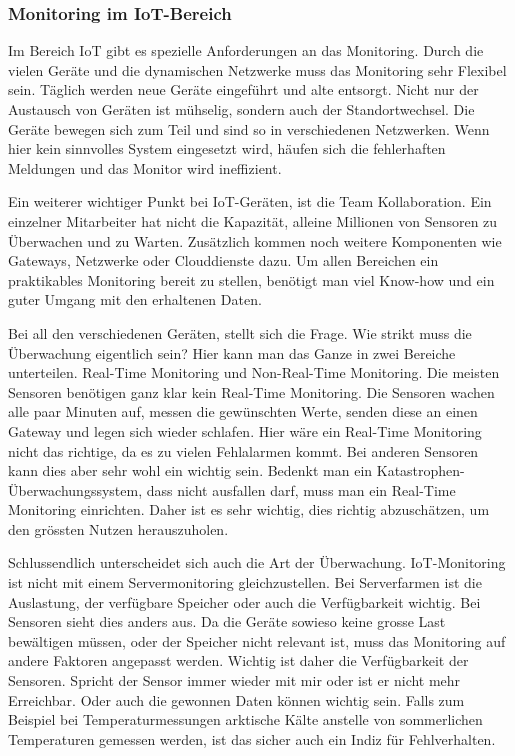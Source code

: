 \subsubsection{Monitoring im IoT-Bereich}
Im Bereich IoT gibt es spezielle Anforderungen an das Monitoring. Durch die vielen Geräte und die dynamischen Netzwerke muss das Monitoring sehr Flexibel sein. Täglich werden neue Geräte eingeführt und alte entsorgt. Nicht nur der Austausch von Geräten ist mühselig, sondern auch der Standortwechsel. Die Geräte bewegen sich zum Teil und sind so in verschiedenen Netzwerken. Wenn hier kein sinnvolles System eingesetzt wird, häufen sich die fehlerhaften Meldungen und das Monitor wird ineffizient.

Ein weiterer wichtiger Punkt bei IoT-Geräten, ist die Team Kollaboration. Ein einzelner Mitarbeiter hat nicht die Kapazität, alleine Millionen von Sensoren zu Überwachen und zu Warten. Zusätzlich kommen noch weitere Komponenten wie Gateways, Netzwerke oder Clouddienste dazu. Um allen Bereichen ein praktikables Monitoring bereit zu stellen, benötigt man viel Know-how und ein guter Umgang mit den erhaltenen Daten.

\text Bei all den verschiedenen Geräten, stellt sich die Frage. Wie strikt muss die Überwachung eigentlich sein? Hier kann man das Ganze in zwei Bereiche unterteilen. Real-Time Monitoring und Non-Real-Time Monitoring. Die meisten Sensoren benötigen ganz klar kein Real-Time Monitoring. Die Sensoren wachen alle paar Minuten auf, messen die gewünschten Werte, senden diese an einen Gateway und legen sich wieder schlafen. Hier wäre ein Real-Time Monitoring nicht das richtige, da es zu vielen Fehlalarmen kommt. Bei anderen Sensoren kann dies aber sehr wohl ein wichtig sein. Bedenkt man ein Katastrophen-Überwachungssystem, dass nicht ausfallen darf, muss man ein Real-Time Monitoring einrichten. Daher ist es sehr wichtig, dies richtig abzuschätzen, um den grössten Nutzen herauszuholen.

Schlussendlich unterscheidet sich auch die Art der Überwachung. IoT-Monitoring ist nicht mit einem Servermonitoring gleichzustellen. Bei Serverfarmen ist die Auslastung, der verfügbare Speicher oder auch die Verfügbarkeit wichtig. Bei Sensoren sieht dies anders aus. Da die Geräte sowieso keine grosse Last bewältigen müssen, oder der Speicher nicht relevant ist, muss das Monitoring auf andere Faktoren angepasst werden. Wichtig ist daher die Verfügbarkeit der Sensoren. Spricht der Sensor immer wieder mit mir oder ist er nicht mehr Erreichbar. Oder auch die gewonnen Daten können wichtig sein. Falls zum Beispiel bei Temperaturmessungen arktische Kälte anstelle von sommerlichen Temperaturen gemessen werden, ist das sicher auch ein Indiz für Fehlverhalten.\cite{MonTypes}
